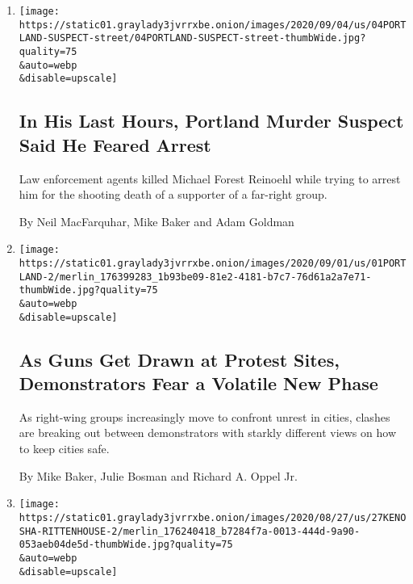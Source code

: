 \begin{enumerate}
\def\labelenumi{\arabic{enumi}.}
\item
  \href{/2020/09/04/us/portland-shooting-michael-reinoehl.html}{}

  \texttt{[image: https://static01.graylady3jvrrxbe.onion/images/2020/09/04/us/04PORTLAND-SUSPECT-street/04PORTLAND-SUSPECT-street-thumbWide.jpg?quality=75\\\&auto=webp\\\&disable=upscale]}

  \hypertarget{in-his-last-hours-portland-murder-suspect-said-he-feared-arrest}{%
  \subsection{In His Last Hours, Portland Murder Suspect Said He Feared
  Arrest}\label{in-his-last-hours-portland-murder-suspect-said-he-feared-arrest}}

  Law enforcement agents killed Michael Forest Reinoehl while trying to
  arrest him for the shooting death of a supporter of a far-right group.

  By Neil MacFarquhar, Mike Baker and Adam Goldman
\item
  \href{/2020/09/01/us/portland-kenosha-protests-clashes.html}{}

  \texttt{[image: https://static01.graylady3jvrrxbe.onion/images/2020/09/01/us/01PORTLAND-2/merlin\_176399283\_1b93be09-81e2-4181-b7c7-76d61a2a7e71-thumbWide.jpg?quality=75\\\&auto=webp\\\&disable=upscale]}

  \hypertarget{as-guns-get-drawn-at-protest-sites-demonstrators-fear-a-volatile-new-phase}{%
  \subsection{As Guns Get Drawn at Protest Sites, Demonstrators Fear a
  Volatile New
  Phase}\label{as-guns-get-drawn-at-protest-sites-demonstrators-fear-a-volatile-new-phase}}

  As right-wing groups increasingly move to confront unrest in cities,
  clashes are breaking out between demonstrators with starkly different
  views on how to keep cities safe.

  By Mike Baker, Julie Bosman and Richard A. Oppel Jr.
\item
  \href{/2020/08/27/us/kyle-rittenhouse-kenosha.html}{}

  \texttt{[image: https://static01.graylady3jvrrxbe.onion/images/2020/08/27/us/27KENOSHA-RITTENHOUSE-2/merlin\_176240418\_b7284f7a-0013-444d-9a90-053aeb04de5d-thumbWide.jpg?quality=75\\\&auto=webp\\\&disable=upscale]}


\end{enumerate}
